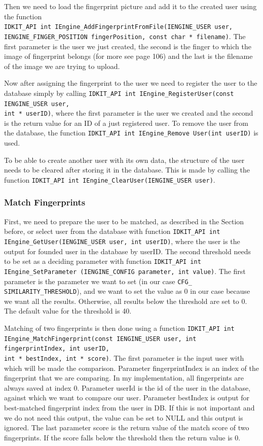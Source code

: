 Then we need to load the fingerprint picture and add it to the created user using the function \\
\texttt{IDKIT\_API int IEngine\_AddFingerprintFromFile(IENGINE\_USER user,\\ IENGINE\_FINGER\_POSITION fingerPosition, const char * filename)}. The first parameter is the user we just created, the second is the finger to which the image of fingerprint belongs (for more see \cite{idkitsdk} page 106) and the last is the filename of the image we are trying to upload.

Now after assigning the fingerprint to the user we need to register the user to the database simply by calling \texttt{IDKIT\_API int IEngine\_RegisterUser(const IENGINE\_USER user, \\int * userID)}, where the first parameter is the user we created and the second is the return value for an ID of a just registered user. To remove the user from the database, the function \texttt{IDKIT\_API int IEngine\_Remove User(int userID)} is used.

To be able to create another user with its own data, the structure of the user needs to be cleared after storing it in the database. This is made by calling the function \texttt{IDKIT\_API int IEngine\_ClearUser(IENGINE\_USER user)}.

\subsubsection{Match Fingerprints}
First, we need to prepare the user to be matched, as described in the Section before, or select user from the database with function \texttt{IDKIT\_API int IEngine\_GetUser(IENGINE\_USER user, int userID)}, where the user is the output for founded user in the database by userID. The second threshold needs to be set as a deciding parameter with function \texttt{IDKIT\_API int IEngine\_SetParame\-ter (IENGINE\_CONFIG parameter, int value)}. The first parameter is the parameter we want to set (in our case \texttt{CFG\_ SIMILARITY\_THRESHOLD}), and we want to set the value as 0 in our case because we want all the results. Otherwise, all results below the threshold are set to 0. The default value for the threshold is 40.

Matching of two fingerprints is then done using a function \texttt{IDKIT\_API int IEngine\_Mat\-chFingerprint(const IENGINE\_USER user, int fingerprintIndex, int userID, \\ int * bestIndex, int * score)}. The first parameter is the input user with which will be made the comparison. Parameter fingerprintIndex is an index of the fingerprint that we are comparing. In my implementation, all fingerprints are always saved at index 0. Parameter userId is the id of the user in the database, against which we want to compare our user. Parameter bestIndex is output for best-matched fingerprint index from the user in DB. If this is not important and we do not need this output, the value can be set to NULL and this output is ignored. The last parameter score is the return value of the match score of two fingerprints. If the score falls below the threshold then the return value is 0.  
  
